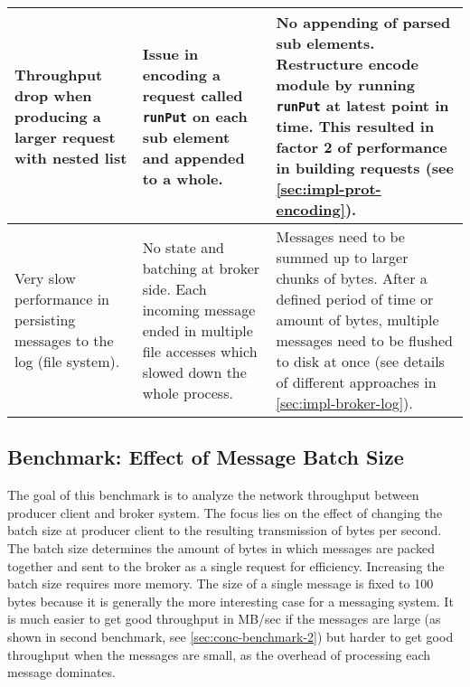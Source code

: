 \begin{table}[H]
\begin{tabular}{|p{4cm}|p{4.5cm}|p{5cm}|}
Throughput drop when producing a larger request with nested list
& Issue in encoding a request called \lstinline{runPut} on each sub element and
appended to a whole.
& No appending of parsed sub elements. Restructure encode module by running
\lstinline{runPut} at latest point in time. This resulted in factor 2 of performance in building requests (see \ref{sec:impl-prot-encoding}).                                                                                                                                      \\ \hline
Very slow performance in persisting messages to the log (file system).                                 & No state and batching at broker side. Each incoming message ended in multiple file accesses which slowed down the whole process.                                                                                                                                & Messages need to be summed up to larger chunks of bytes. After a defined period of time or amount of bytes, multiple messages need to be flushed to disk at once (see details of different approaches in \ref{sec:impl-broker-log}).                                                                                                                                      \\ \hline
\end{tabular}
\end{table}

\newpage
\subsection{Benchmark: Effect of Message Batch Size}
\label{sec:conc-benchmark-1}

The goal of this benchmark is to analyze the network throughput between producer
client and broker system.  The focus lies on the effect of changing the batch
size at producer client to the resulting transmission of bytes per second. The
batch size determines the amount of bytes in which messages are packed
together and sent to the broker as a single request for efficiency. Increasing the
batch size requires more memory. The size of a single message is fixed to 100
bytes because it is generally the more interesting case for a messaging system. It is much easier to get good throughput in MB/sec if the messages are
large (as shown in second benchmark, see \ref{sec:conc-benchmark-2}) but
harder to get good throughput when the messages are small, as the overhead of
processing each message dominates.

